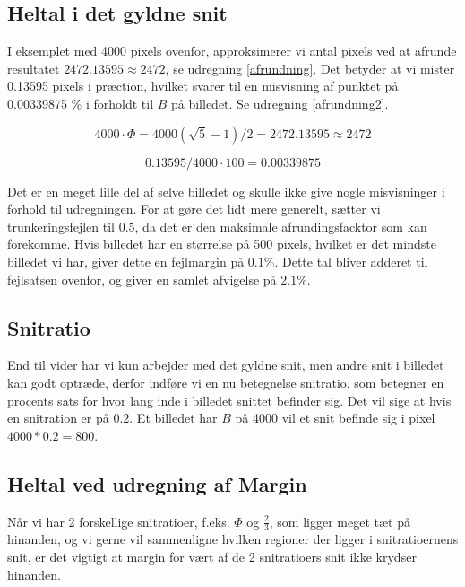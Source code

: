 \subsection{Heltal i det gyldne snit}

I eksemplet med 4000 pixels ovenfor, approksimerer vi antal pixels ved
at afrunde resultatet $2472.13595 \approx 2472$, se udregning
\ref{afrundning}. Det betyder at vi mister 0.13595 pixels i præction,
hvilket svarer til en misvisning af punktet på 0.00339875 $\%$ i forholdt
til $B$ på billedet. Se udregning \ref{afrundning2}.

\begin{equation}
	4000 \cdot \varPhi = 4000(\sqrt{5}-1)/2 = 2472.13595 \approx 2472 \label{afrundning}
\end{equation}

\begin{equation}
	0.13595/4000 \cdot 100 = 0.00339875 \label{afrundning2}
\end{equation}

Det er en meget lille del af selve billedet og skulle ikke give nogle
misvisninger i forhold til udregningen. For at gøre det lidt mere
generelt, sætter vi trunkeringsfejlen til $0.5$, da det er den maksimale
afrundingsfacktor som kan forekomme. Hvis billedet har en størrelse på
500 pixels, hvilket er det mindste billedet vi har, giver dette en fejlmargin
på $0.1 \%$. Dette tal bliver adderet til fejlsatsen ovenfor, og giver
en samlet afvigelse på $2.1\%$.

\subsection{Snitratio}
End til vider har vi kun arbejder med det gyldne snit, men andre snit i
billedet kan godt optræde, derfor indføre vi en nu betegnelse
snitratio, som betegner en procents sats for hvor lang inde i billedet
snittet befinder sig. Det vil sige at hvis en snitration er på $0.2$. Et
billedet har $B$ på 4000 vil et snit befinde sig i pixel $4000*0.2 =
800$.

\subsection{Heltal ved udregning af Margin}
Når vi har 2 forskellige snitratioer, f.eks. $\varPhi$ og $\frac{2}{3}$,
som ligger meget tæt på hinanden, og vi gerne vil sammenligne hvilken
regioner der ligger i snitratioernens snit, er det vigtigt at margin for
vært af de 2 snitratioers snit ikke krydser hinanden. 

